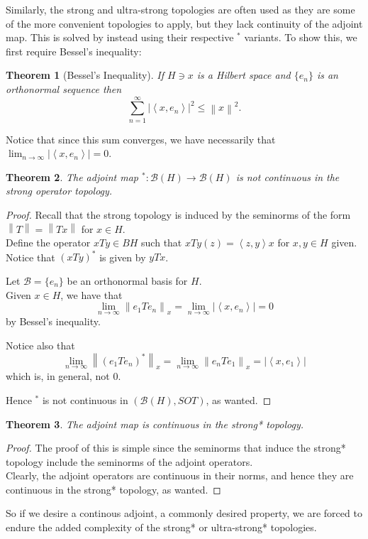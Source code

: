 \documentclass{article}
\theoremstyle{plain}
\newtheorem{theorem}{Theorem}
\theoremstyle{definition}
\newcommand{\abs}[1]{\left\lvert #1 \right\rvert}
\newcommand{\inner}[2]{\left\langle #1, #2 \right\rangle}
\newcommand{\norm}[1]{\left\lVert #1 \right\rVert}
\newcommand{\BH}{\cal{B}(H)}
\renewcommand{\cal}[1]{\mathcal{#1}}
\begin{document}
        Similarly, the strong and ultra-strong topologies are often used as they are some of the more convenient topologies to apply, but they lack continuity of the adjoint map. This is solved by instead using their respective $^*$ variants.
        To show this, we first require Bessel's inequality:
        \begin{theorem}[Bessel's Inequality]
                If $H \ni x$ is a Hilbert space and $\{e_n\}$ is an orthonormal sequence then
                        $$ \sum_{n=1}^\infty \abs{\inner{x}{e_n}}^2 \leq \norm{x}^2.$$
        \end{theorem}
        Notice that since this sum converges, we have necessarily that $\lim_{n\to\infty} \abs{\inner{x}{e_n}} = 0$.

        \begin{theorem}
                The adjoint map $^* : \BH \to \BH$ is not continuous in the strong operator topology.
        \end{theorem}
        \begin{proof}
                Recall that the strong topology is induced by the seminorms of the form $\norm{T} = \norm{Tx}$ for $x \in H$.\\
                Define the operator $xTy \in BH$ such that $xTy(z) = \inner{z}{y}{x}$ for $x, y \in H$ given.\\
                Notice that $(xTy)^*$ is given by $yTx$.

                Let $\cal{B} = \{e_n\}$ be an orthonormal basis for $H$.\\
                Given $x \in H$, we have that
                        $$ \lim_{n\to\infty} \norm{e_1 T e_n}_x = \lim_{n\to\infty} \abs{\inner{x}{e_n}} = 0$$
                by Bessel's inequality.

                Notice also that 
                        $$\lim_{n\to\infty} \norm{(e_1 T e_n)^*}_x = \lim_{n\to\infty} \norm{e_n T e_1}_x = \abs{\inner{x}{e_1}}$$
                which is, in general, not 0.

                Hence $^*$ is not continuous in $(\BH, SOT)$, as wanted.
        \end{proof}

        \begin{theorem}
                The adjoint map is continuous in the strong* topology.
        \end{theorem}
        \begin{proof}
                The proof of this is simple since the seminorms that induce the strong* topology include the seminorms of the adjoint operators.\\
                Clearly, the adjoint operators are continuous in their norms, and hence they are continuous in the strong* topology, as wanted.
        \end{proof}
        So if we desire a continous adjoint, a commonly desired property, we are forced to endure the added complexity of the strong* or ultra-strong* topologies.
\end{document}
